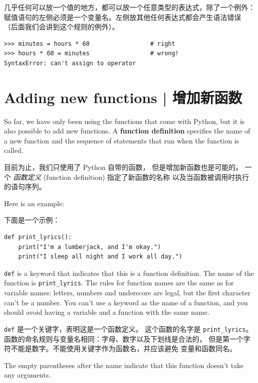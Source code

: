 几乎任何可以放一个值的地方，都可以放一个任意类型的表达式，除了一个例外：
赋值语句的左侧必须是一个变量名。左侧放其他任何表达式都会产生语法错误
（后面我们会讲到这个规则的例外）。

\begin{lstlisting}
>>> minutes = hours * 60                 # right
>>> hours * 60 = minutes                 # wrong!
SyntaxError: can't assign to operator
\end{lstlisting}
%
  


%
\section{Adding new functions  |  增加新函数}

So far, we have only been using the functions that come with Python,
but it is also possible to add new functions.
A {\bf function definition} specifies the name of a new function and
the sequence of statements that run when the function is called.

目前为止，我们只使用了 Python 自带的函数， 但是增加新函数也是可能的。
一个 \emph{函数定义} (function definition) 指定了新函数的名称
以及当函数被调用时执行的语句序列。
    
    

Here is an example:

下面是一个示例：


\begin{lstlisting}
def print_lyrics():
    print("I'm a lumberjack, and I'm okay.")
    print("I sleep all night and I work all day.")
\end{lstlisting}
%
{\tt def} is a keyword that indicates that this is a function
definition.  The name of the function is \verb"print_lyrics".  The
rules for function names are the same as for variable names: letters,
numbers and underscore are legal, but the first character
can't be a number.  You can't use a keyword as the name of a function,
and you should avoid having a variable and a function with the same
name.

\lstinline{def} 是一个关键字，表明这是一个函数定义。
这个函数的名字是 \lstinline{print_lyrics}。
函数的命名规则与变量名相同：字母、数字以及下划线是合法的，
但是第一个字符不能是数字。不能使用关键字作为函数名，并应该避免
变量和函数同名。
    

The empty parentheses after the name indicate that this function
doesn't take any arguments.

